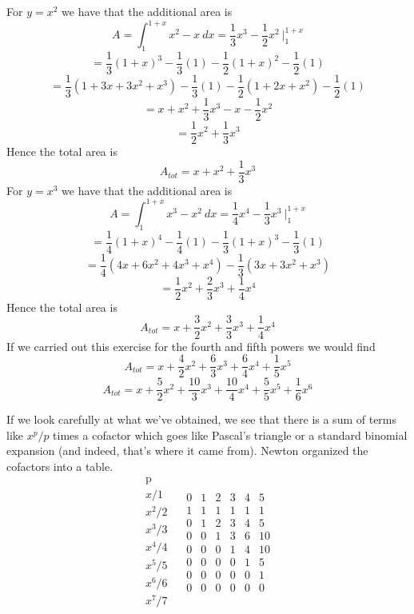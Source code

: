 \documentclass[11pt, oneside]{article}
\begin{document}
\noindent For $y = x^2$ we have that the additional area is
\[ A = \int_1^{1+x} x^2 - x \ dx =  \frac{1}{3} x^3 - \frac{1}{2} x^2 \ \bigg |_1^{1+x} \]
\[ = \frac{1}{3} (1+x)^3 - \frac{1}{3}(1) - \frac{1}{2} (1+x)^2 - \frac{1}{2}(1) \]
\[ = \frac{1}{3} (1 + 3x + 3x^2 + x^3) - \frac{1}{3}(1) - \frac{1}{2} (1 + 2x + x^2) - \frac{1}{2}(1) \]
\[ = x + x^2 + \frac{1}{3}x^3 - x - \frac{1}{2}x^2 \]
\[ = \frac{1}{2}x^2 + \frac{1}{3}x^3 \]
Hence the total area is
\[ A_{tot} = x + x^2 + \frac{1}{3}x^3 \]
\noindent For $y = x^3$ we have that the additional area is
\[ A = \int_1^{1+x} x^3 - x^2 \ dx =  \frac{1}{4} x^4 - \frac{1}{3} x^3 \ \bigg |_1^{1+x} \]
\[ = \frac{1}{4} (1+x)^4 - \frac{1}{4}(1) - \frac{1}{3} (1+x)^3  - \frac{1}{3}(1)\]
\[ = \frac{1}{4}(4x + 6x^2 + 4x^3 + x^4) - \frac{1}{3} (3x + 3x^2 + x^3) \]
\[ = \frac{1}{2}x^2 + \frac{2}{3}x^3 + \frac{1}{4}x^4 \]
Hence the total area is
\[ A_{tot} = x + \frac{3}{2}x^2 + \frac{3}{3}x^3 + \frac{1}{4}x^4 \]
If we carried out this exercise for the fourth and fifth powers we would find
\[ A_{tot} = x + \frac{4}{2}x^2 + \frac{6}{3}x^3 + \frac{6}{4}x^4 + \frac{1}{5}x^5 \]
\[ A_{tot} = x + \frac{5}{2}x^2 + \frac{10}{3}x^3 + \frac{10}{4}x^4 + \frac{5}{5}x^5 + \frac{1}{6}x^6 \]
\vspace{2 mm}

If we look carefully at what we've obtained, we see that there is a sum of terms like $x^p/p$ times a cofactor which goes like Pascal's triangle or a standard binomial expansion (and indeed, that's where it came from).  Newton organized the cofactors into a table.
\[
\begin{matrix}
\text{p}  \\
x/1  \\
x^2/2 \\
x^3/3 \\
x^4/4 \\
x^5/5 \\
x^6/6 \\
x^7/7
\end{matrix} \ \ \ \
\begin{matrix}
0 & 1 & 2 & 3 & 4 & 5  \\
1 & 1 & 1 & 1 & 1 & 1  \\
0 & 1 & 2 & 3 & 4 & 5 \\
0 & 0 & 1 & 3 & 6 & 10 \\
0 & 0 & 0 & 1 & 4 & 10 \\
0 & 0 & 0 & 0 & 1 & 5 \\
0 & 0 & 0 & 0 & 0 & 1 \\
0 & 0 & 0 & 0 & 0 & 0
\end{matrix}
\]
\end{document}

